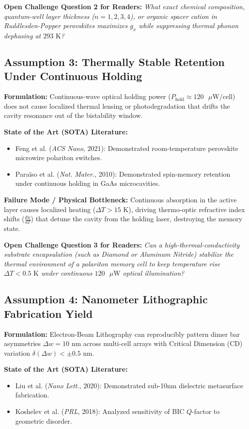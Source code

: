 \documentclass[11pt,a4paper]{article}
\begin{document}
\textbf{Open Challenge Question 2 for Readers:}
\textit{What exact chemical composition, quantum-well layer thickness ($n=1,2,3,4$), or organic spacer cation in Ruddlesden-Popper perovskites maximizes $g_x$ while suppressing thermal phonon dephasing at $293\text{ K}$?}

\subsection{Assumption 3: Thermally Stable Retention Under Continuous Holding}
\textbf{Formulation:} Continuous-wave optical holding power ($P_{\text{hold}} \approx 120\text{ }\mu\text{W/cell}$) does not cause localized thermal lensing or photodegradation that drifts the cavity resonance out of the bistability window.

\textbf{State of the Art (SOTA) Literature:}
\begin{itemize}
    \item Feng et al. (\textit{ACS Nano}, 2021): Demonstrated room-temperature perovskite microwire polariton switches.
    \item Para\"iso et al. (\textit{Nat. Mater.}, 2010): Demonstrated spin-memory retention under continuous holding in GaAs microcavities.
\end{itemize}

\textbf{Failure Mode / Physical Bottleneck:}
Continuous absorption in the active layer causes localized heating ($\Delta T > 15\text{ K}$), driving thermo-optic refractive index shifts ($\frac{dn}{dT}$) that detune the cavity from the holding laser, destroying the memory state.

\textbf{Open Challenge Question 3 for Readers:}
\textit{Can a high-thermal-conductivity substrate encapsulation (such as Diamond or Aluminum Nitride) stabilize the thermal environment of a polariton memory cell to keep temperature rise $\Delta T < 0.5\text{ K}$ under continuous $120\text{ }\mu\text{W}$ optical illumination?}

\subsection{Assumption 4: Nanometer Lithographic Fabrication Yield}
\textbf{Formulation:} Electron-Beam Lithography can reproducibly pattern dimer bar asymmetries $\Delta w = 10\text{ nm}$ across multi-cell arrays with Critical Dimension (CD) variation $\delta(\Delta w) < \pm 0.5\text{ nm}$.

\textbf{State of the Art (SOTA) Literature:}
\begin{itemize}
    \item Liu et al. (\textit{Nano Lett.}, 2020): Demonstrated sub-10nm dielectric metasurface fabrication.
    \item Koshelev et al. (\textit{PRL}, 2018): Analyzed sensitivity of BIC $Q$-factor to geometric disorder.
\end{itemize}
\end{document}
